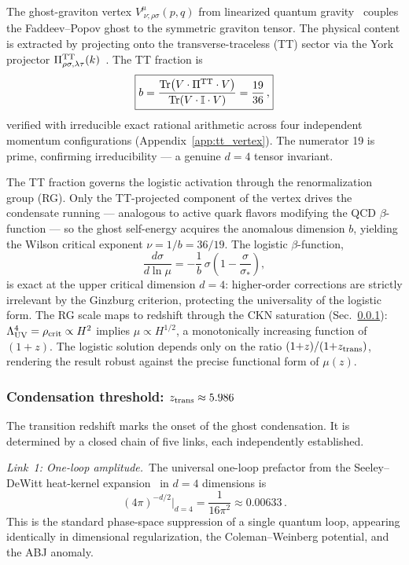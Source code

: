 \documentclass[a4paper,fleqn]{cas-dc}
\newcommand{\ztrans}{z_{\rm trans}}
\begin{document}
The ghost-graviton vertex
$V^\mu_{\;\nu;\rho\sigma}(p,q)$ from linearized quantum
gravity~\cite{codello2009} couples the Faddeev--Popov ghost to the
symmetric graviton tensor. The physical content is extracted by
projecting onto the transverse-traceless (TT) sector via the York
projector
$\Pi^{\rm TT}_{\rho\sigma,\lambda\tau}(k)$~\cite{york1973}. The TT
fraction is
\begin{equation}
\boxed{b = \frac{{\rm Tr}\!\left(
  V \cdot \Pi^{\rm TT} \cdot V\right)}{{\rm Tr}\!\left(
  V \cdot \mathbb{I} \cdot V\right)} = \frac{19}{36}\,,}
\label{eq:b}
\end{equation}
verified with irreducible exact rational arithmetic across four
independent momentum configurations (Appendix~\ref{app:tt_vertex}). The
numerator 19 is prime, confirming irreducibility --- a genuine
$d = 4$ tensor invariant.

The TT fraction governs the logistic activation through the
renormalization group (RG). Only the TT-projected component of the
vertex drives the condensate running --- analogous to active quark
flavors modifying the QCD $\beta$-function --- so the ghost
self-energy acquires the anomalous dimension $b$, yielding the Wilson
critical exponent $\nu = 1/b = 36/19$. The logistic $\beta$-function,
\begin{equation}
\frac{d\sigma}{d\ln\mu} =
  -\frac{1}{b}\,\sigma\!\left(1 -
  \frac{\sigma}{\sigma_*}\right),
\label{eq:beta}
\end{equation}
is exact at the upper critical dimension $d = 4$: higher-order
corrections are strictly irrelevant by the Ginzburg criterion,
protecting the universality of the logistic form. The RG scale maps
to redshift through the CKN saturation
(Sec.~\ref{sec:ztrans}):
$\Lambda_{\rm UV}^4 = \rho_{\rm crit} \propto H^2$ implies
$\mu \propto H^{1/2}$, a monotonically increasing function of
$(1{+}z)$. The logistic solution depends only on the ratio
$(1{+}z)/(1{+}\ztrans)$, rendering the result robust against the
precise functional form of $\mu(z)$.

\subsubsection{Condensation threshold: $\ztrans \approx 5.986$}
\label{sec:ztrans}

The transition redshift marks the onset of the ghost condensation. It
is determined by a closed chain of five links, each independently
established.

\textit{Link~1: One-loop amplitude.}~The universal one-loop prefactor
from the Seeley--DeWitt heat-kernel expansion~\cite{vassilevich2003}
in $d = 4$ dimensions is
\begin{equation}
(4\pi)^{-d/2}\big|_{d=4} = \frac{1}{16\pi^2} \approx 0.00633\,.
\label{eq:hk_prefactor}
\end{equation}
This is the standard phase-space suppression of a single quantum loop,
appearing identically in dimensional regularization, the
Coleman--Weinberg potential, and the ABJ anomaly.
\end{document}
